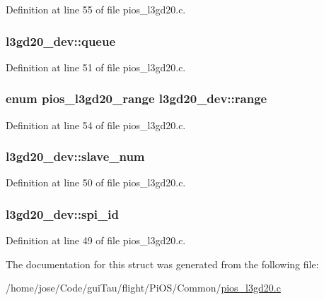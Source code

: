 Definition at line 55 of file pios\-\_\-l3gd20.\-c.

\hypertarget{structl3gd20__dev_afaf30977299d2f23c110c98529cf35f3}{
\subsubsection[{queue}]{ l3gd20\-\_\-dev\-::queue}}\label{structl3gd20__dev_afaf30977299d2f23c110c98529cf35f3}


Definition at line 51 of file pios\-\_\-l3gd20.\-c.

\hypertarget{structl3gd20__dev_a76218293ab5447354c7f7f0b2772a8f3}{
\subsubsection[{range}]{\setlength{\rightskip}{0pt plus 5cm}enum {\bf pios\-\_\-l3gd20\-\_\-range} l3gd20\-\_\-dev\-::range}}\label{structl3gd20__dev_a76218293ab5447354c7f7f0b2772a8f3}


Definition at line 54 of file pios\-\_\-l3gd20.\-c.

\hypertarget{structl3gd20__dev_a8bf2ef5a58b8a774ee762ff497ddcd91}{
\subsubsection[{slave\-\_\-num}]{ l3gd20\-\_\-dev\-::slave\-\_\-num}}\label{structl3gd20__dev_a8bf2ef5a58b8a774ee762ff497ddcd91}


Definition at line 50 of file pios\-\_\-l3gd20.\-c.

\hypertarget{structl3gd20__dev_a8d81d143afb3dd150d8302d4ffa9f1c5}{
\subsubsection[{spi\-\_\-id}]{ l3gd20\-\_\-dev\-::spi\-\_\-id}}\label{structl3gd20__dev_a8d81d143afb3dd150d8302d4ffa9f1c5}


Definition at line 49 of file pios\-\_\-l3gd20.\-c.



The documentation for this struct was generated from the following file\-:\begin{DoxyCompactItemize}
\item 
/home/jose/\-Code/gui\-Tau/flight/\-Pi\-O\-S/\-Common/\hyperlink{pios__l3gd20_8c}{pios\-\_\-l3gd20.\-c}\end{DoxyCompactItemize}
